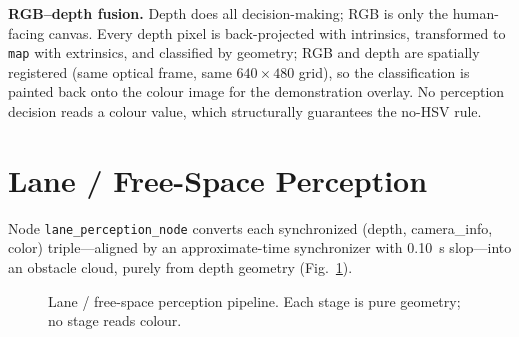 \documentclass[10pt,journal,twoside]{IEEEtran}
\begin{document}
\noindent \textbf{RGB--depth fusion.} Depth does all decision-making; RGB is only the human-facing canvas. Every depth pixel is back-projected with intrinsics, transformed to \texttt{map} with extrinsics, and classified by geometry; RGB and depth are spatially registered (same optical frame, same $640\times480$ grid), so the classification is painted back onto the colour image for the demonstration overlay. No perception decision reads a colour value, which structurally guarantees the no-HSV rule.

\section{Lane / Free-Space Perception}
\label{sec:lane}
Node \texttt{lane\_perception\_node} converts each synchronized (depth, camera\_info, color) triple---aligned by an approximate-time synchronizer with 0.10~s slop---into an obstacle cloud, purely from depth geometry (Fig.~\ref{fig:lane}).

\begin{figure}[!t]
\centering
{}
\caption{Lane / free-space perception pipeline. Each stage is pure geometry; no stage reads colour.}
\label{fig:lane}
\end{figure}
\end{document}
